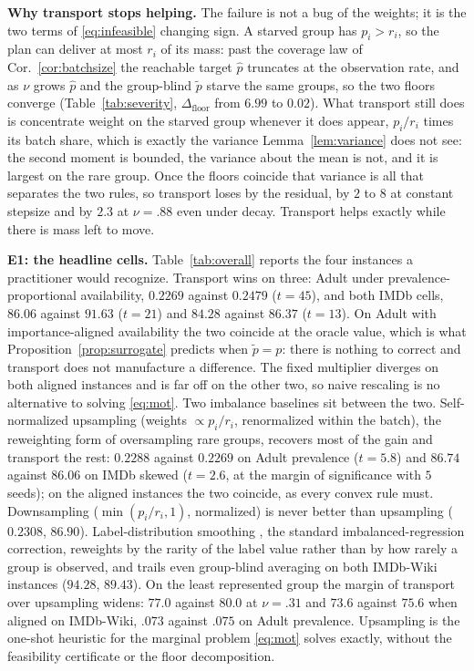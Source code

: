 \noindent\textbf{Why transport stops helping.}
The failure is not a bug of the weights; it is the two terms of
\eqref{eq:infeasible} changing sign. A starved group has $p_i>r_i$, so the
plan can deliver at most $r_i$ of its mass: past the coverage law of
Cor.~\ref{cor:batchsize} the reachable target $\hat p$ truncates at the
observation rate, and as $\nu$ grows $\hat p$ and the group-blind $\tilde p$
starve the same groups, so the two floors converge (Table~\ref{tab:severity},
$\Delta_{\mathrm{floor}}$ from $6.99$ to $0.02$). What transport still does
is concentrate weight on the starved group whenever it does appear, $p_i/r_i$
times its batch share, which is exactly the variance Lemma~\ref{lem:variance}
does not see: the second moment is bounded, the variance about the mean is
not, and it is largest on the rare group. Once the floors coincide that
variance is all that separates the two rules, so transport loses by the
residual, by $2$ to $8$ at constant stepsize and by $2.3$ at $\nu{=}.88$ even
under decay. Transport helps exactly while there is mass left to move.

\noindent\textbf{E1: the headline cells.}
Table~\ref{tab:overall} reports the four instances a practitioner would
recognize. Transport wins on three: Adult under prevalence-proportional
availability, $0.2269$ against $0.2479$ ($t{=}45$), and both IMDb cells,
$86.06$ against $91.63$ ($t{=}21$) and $84.28$ against $86.37$ ($t{=}13$). On
Adult with importance-aligned availability the two coincide at the oracle
value, which is what Proposition~\ref{prop:surrogate} predicts when
$\tilde p=p$: there is nothing to correct and transport does not manufacture a
difference. The fixed multiplier diverges on both aligned instances and is far
off on the other two, so naive rescaling is no alternative to solving \eqref{eq:mot}.
Two imbalance baselines sit between the two. Self-normalized upsampling
(weights $\propto p_i/r_i$, renormalized within the batch), the reweighting
form of oversampling rare groups, recovers most of the gain and transport
the rest: $0.2288$ against $0.2269$ on Adult prevalence ($t{=}5.8$) and
$86.74$ against $86.06$ on IMDb skewed ($t{=}2.6$, at the margin of
significance with $5$ seeds); on the aligned instances the two coincide, as
every convex rule must. Downsampling ($\min(p_i/r_i,1)$, normalized) is never
better than upsampling ($0.2308$, $86.90$). Label-distribution smoothing
\cite{yang2021dir}, the standard imbalanced-regression correction, reweights
by the rarity of the label value rather than by how rarely a group is
observed, and trails even group-blind averaging on both IMDb-Wiki instances
($94.28$, $89.43$). On the least represented group the margin of transport
over upsampling widens: $77.0$ against $80.0$ at $\nu{=}.31$ and $73.6$
against $75.6$ when aligned on IMDb-Wiki, $.073$ against $.075$ on Adult
prevalence. Upsampling is the one-shot heuristic for the marginal problem
\eqref{eq:mot} solves exactly, without the feasibility certificate or the
floor decomposition.

